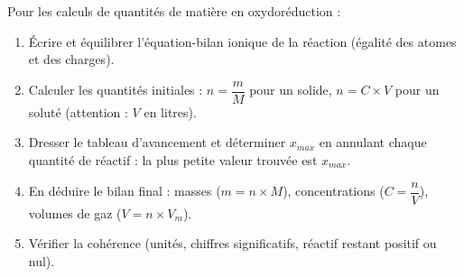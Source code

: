 \documentclass[11pt]{article}
\begin{document}
\begin{methode}
Pour les calculs de quantités de matière en oxydoréduction :
\begin{enumerate}
\item Écrire et équilibrer l'équation-bilan ionique de la réaction (égalité des atomes et des charges).
\item Calculer les quantités initiales : $n = \dfrac{m}{M}$ pour un solide, $n = C \times V$ pour un soluté (attention : $V$ en litres).
\item Dresser le tableau d'avancement et déterminer $x_{max}$ en annulant chaque quantité de réactif : la plus petite valeur trouvée est $x_{max}$.
\item En déduire le bilan final : masses ($m = n \times M$), concentrations ($C = \dfrac{n}{V}$), volumes de gaz ($V = n \times V_m$).
\item Vérifier la cohérence (unités, chiffres significatifs, réactif restant positif ou nul).
\end{enumerate}
\end{methode}
\end{document}
